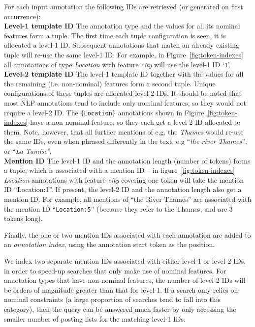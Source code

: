 For each input annotation the following IDs are retrieved (or generated on first
occurrence):\\
{\bf Level-1 template ID} The annotation type and the values for all its nominal
features form a tuple. The first time each tuple configuration is seen, it is
allocated a level-1 ID. Subsequent annotations that match an already existing
tuple will re-use the same level-1 ID. For example, in
Figure~\ref{fig:token-indexes} all annotations of type {\em Location} with
feature {\em city} will use the level-1 ID `{\tt 1}'.\\
{\bf Level-2 template ID} The level-1 template ID together with the values for
all the remaining (i.e. non-nominal) features form a second tuple. Unique
configurations of these tuples are allocated level-2 IDs. It should be noted
that most NLP annotations tend to include only nominal features, so they would
not require a level-2 ID. The \verb!{Location}! annotations shown in
Figure~\ref{fig:token-indexes} have a non-nominal feature, so they each get a
level-2 ID allocated to them. Note, however, that all further mentions of e.g.
the {\em Thames} would re-use the same IDs, even when phrased differently in
the text, e.g ``{\em the river Thames}'', or ``{\em La Tamise}''.
\\
{\bf Mention ID} The level-1 ID and the annotation length (number of tokens)
forms a tuple, which is associated with a mention ID -- in
figure~\ref{fig:token-indexes} {\em Location} annotations with feature {\em
city} covering one token will take the mention ID ``Location:1''. If present,
the level-2 ID and the annotation length also get a mention ID. For example, all
mentions of ``the River Thames'' are associated with the mention ID
``{\tt Location:5}'' (because they refer to the Thames, and are 3 tokens long).

Finally, the one or two mention IDs associated with each annotation are added to
an \emph{annotation index}, using the annotation start token as
the position. 

We index two separate mention IDs associated with either level-1 or level-2 IDs,
in order to speed-up searches that only make use of nominal features. For
annotation types that have non-nominal features, the number of level-2 IDs will
be orders of magnitude greater than that for level-1. If a search only relies on
nominal constraints (a large proportion of searches tend to fall into this
category), then the query can be answered much faster by only accessing the
smaller number of posting lists for the matching level-1 IDs.
